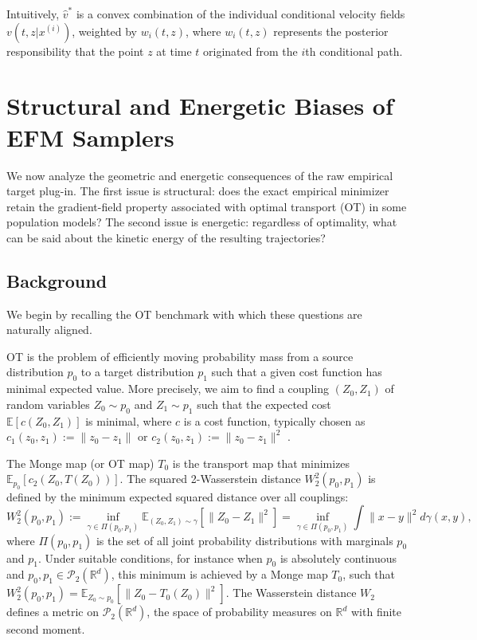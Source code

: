 \documentclass[a4paper,11pt]{article}
\newcommand{\R}{\mathbb{R}}
\theoremstyle{plain}
\theoremstyle{definition}
\begin{document}
Intuitively, $\hat{v}^*$ is a convex combination of the individual conditional velocity fields $v(t, z| x^{(i)})$, weighted by $w_i(t, z)$, where $w_i(t,z)$ represents the posterior responsibility that the point $z$ at time $t$ originated from the $i$th conditional path.

\section{Structural and Energetic Biases of EFM Samplers} \label{sec:energy}

We now analyze the geometric and energetic consequences of the raw empirical target plug-in. The first issue is structural: does the exact empirical minimizer retain the gradient-field property associated with optimal transport (OT) in some population models? The second issue is energetic: regardless of optimality, what can be said about the kinetic energy of the resulting trajectories?

\subsection{Background}
We begin by recalling the OT benchmark with which these questions are naturally aligned.

 OT is the problem of efficiently moving probability mass from a source distribution $p_0$ to a target distribution $p_1$ such that a given cost function has minimal expected value. More precisely, we aim to find a coupling $(Z_0, Z_1)$ of random variables $Z_0 \sim p_0$ and $Z_1 \sim p_1$ such that the expected cost $\mathbb{E}[c(Z_0, Z_1)]$ is minimal, where $c$ is a cost function, typically chosen as $c_1(z_0, z_1) := \|z_0 - z_1\|$  or $c_2(z_0, z_1) := \|z_0 - z_1\|^2$ \cite{chewi2024statistical, peyre2025optimal}. 

The Monge map (or OT map) $T_0$ is the transport map that minimizes $\mathbb{E}_{p_0}[c_2(Z_0, T(Z_0))]$. The squared 2-Wasserstein distance $W_2^2(p_0, p_1)$ is defined by the minimum expected squared distance over all couplings:$$W_2^2(p_0, p_1) := \inf_{\gamma \in \Pi(p_0, p_1)} \mathbb{E}_{ (Z_0, Z_1) \sim \gamma } [\|Z_0 - Z_1\|^2] = \inf_{\gamma \in \Pi(p_0, p_1)} \int \|x - y\|^2 d\gamma(x,y),$$ 
where $\Pi(p_0, p_1)$ is the set of all joint probability distributions with marginals $p_0$ and $p_1$. 
Under suitable conditions, for instance when \(p_0\) is absolutely continuous and \(p_0,p_1\in\mathcal P_2(\mathbb R^d)\), this minimum is achieved by a Monge map \(T_0\), such that $W_2^2(p_0, p_1) = \mathbb{E}_{Z_0 \sim p_0}[\|Z_0 - T_0(Z_0)\|^2]$.  The Wasserstein distance $W_2$ defines a metric on $\mathcal{P}_2(\R^d)$, the space of probability measures on $\R^d$ with finite second moment.
\end{document}
